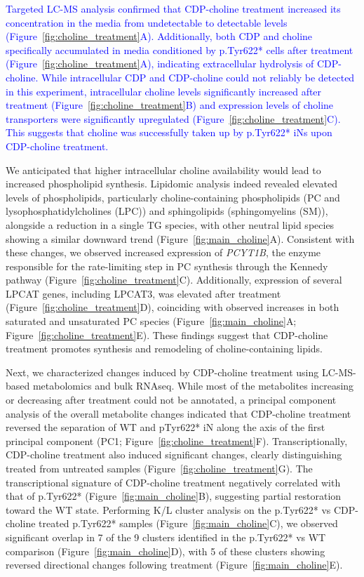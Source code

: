 \newcommand{\quoteD}{\textcolor{blue}{Targeted LC-MS analysis confirmed that CDP-choline treatment increased its concentration in the media from undetectable to detectable levels (Figure~\ref{fig:choline_treatment}A). Additionally, both CDP and choline specifically accumulated in media conditioned by p.Tyr622* cells after treatment (Figure~\ref{fig:choline_treatment}A), indicating extracellular hydrolysis of CDP-choline. While intracellular CDP and CDP-choline could  not reliably be detected in this experiment, intracellular choline levels significantly increased after treatment (Figure~\ref{fig:choline_treatment}B) and expression levels of choline transporters were significantly upregulated (Figure~\ref{fig:choline_treatment}C). This suggests that choline was successfully taken up by p.Tyr622* iNs upon CDP-choline treatment.\label{quoteD-label}}} 
\quoteD

We anticipated that higher intracellular choline availability would lead to increased phospholipid synthesis. Lipidomic analysis indeed revealed elevated levels of phospholipids, particularly choline-containing phospholipids (PC and lysophosphatidylcholines (LPC)) and sphingolipids (sphingomyelins (SM)), alongside a reduction in a single TG species, with other neutral lipid species showing a similar downward trend (Figure~\ref{fig:main_choline}A). Consistent with these changes, we observed increased expression of \textit{PCYT1B}, the enzyme responsible for the rate-limiting step in PC synthesis through the Kennedy pathway (Figure~\ref{fig:choline_treatment}C). Additionally, expression of several LPCAT genes, including LPCAT3, was elevated after treatment (Figure~\ref{fig:choline_treatment}D), coinciding with observed increases in both saturated and unsaturated PC species (Figure~\ref{fig:main_choline}A; Figure~\ref{fig:choline_treatment}E). These findings suggest that CDP-choline treatment promotes synthesis and remodeling of choline-containing lipids.

Next, we characterized changes induced by CDP-choline treatment using LC-MS-based metabolomics and bulk RNAseq. While most of the metabolites increasing or decreasing after treatment could not be annotated, a principal component analysis of the overall metabolite changes indicated that CDP-choline treatment reversed the separation of WT and pTyr622* iN along the axis of the first principal component (PC1; Figure~\ref{fig:choline_treatment}F). Transcriptionally, CDP-choline treatment also induced significant changes, clearly distinguishing treated from untreated samples (Figure~\ref{fig:choline_treatment}G). The transcriptional signature of CDP-choline treatment negatively correlated with that of p.Tyr622* (Figure~\ref{fig:main_choline}B), suggesting partial restoration toward the WT state. Performing K/L cluster analysis on the p.Tyr622* vs CDP-choline treated p.Tyr622* samples (Figure~\ref{fig:main_choline}C), we observed significant overlap in 7 of the 9 clusters identified in the p.Tyr622* vs WT comparison (Figure~\ref{fig:main_choline}D), with 5 of these clusters showing reversed directional changes following treatment (Figure~\ref{fig:main_choline}E). 

